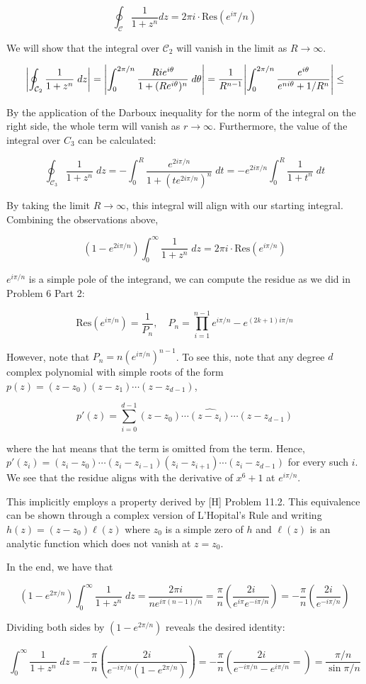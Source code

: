 \documentclass[12pt]{article}%
\newcommand{\C}{\mathcal{C}}
\begin{document}
\begin{enumerate}[i.]
  \[ \oint_{\C} \frac{1}{1 + z^n} dz = 2\pi i \cdot \text{Res}(e^{i \pi}/ n) \]

  We will show that the integral over $\C_2$ will vanish in the limit as $R \rightarrow \infty$.

  \begin{align*}
    \abs{\oint_{\C_2} \frac{1}{1 + z^n} \; dz} = \abs{\int_0^{2\pi/n} \frac{Rie^{i\theta}}{1 + (Re^{i\theta})^n}\; d\theta} = \frac{1}{R^{n-1}} \abs{\int_0^{2\pi/n} \frac{e^{i\theta}}{e^{ni\theta} + 1/R^n}} \leq
  \end{align*}

By the application of the Darboux inequality for the norm of the integral on the right side, the whole term will vanish as $r \rightarrow \infty$. Furthermore, the value of the integral over $C_3$ can be calculated:

\[ \oint_{\C_3} \frac{1}{1 + z^n} \; dz = - \int_{0}^{R} \frac{e^{2i\pi /n}}{1 + (te^{2i\pi/n})^n} \; dt = - e^{2i\pi/n} \int_0^R \frac{1}{1 + t^n} \; dt \]

By taking the limit $R \rightarrow \infty$, this integral will align with our starting integral. Combining the observations above,

\[ (1-e^{2i\pi/n})\int_0^\infty \frac{1}{1 + z^n} \; dz = 2\pi i \cdot \text{Res}(e^{i\pi/n}) \]

$e^{i\pi/n}$ is a simple pole of the integrand, we can compute the residue as we did in Problem 6 Part 2:

$$ \text{Res}(e^{i\pi /n}) = \frac{1}{P_n}, \quad P_n = \prod_{i=1}^{n-1} e^{i\pi/n} - e^{(2k+1)i\pi/n}$$

However, note that $P_n = n(e^{i\pi/n})^{n-1}$. To see this, note that any degree $d$ complex polynomial with simple roots of the form $p(z) = (z-z_0)(z-z_1)\cdots (z - z_{d-1})$,

\[p'(z) = \sum_{i = 0}^{d-1} (z-z_0)\cdots\widehat{(z-z_i)}\cdots (z- z_{d-1}) \]

where the hat means that the term is omitted from the term. Hence, $p'(z_i) = (z_i - z_0)\cdots (z_i - z_{i-1})(z_i - z_{i+
1})\cdots(z_i - z_{d-1})$ for every such $i$. We see that the residue aligns with the derivative of $x^6+1$ at $e^{i\pi/n}$.

This implicitly employs a property derived by [H] Problem 11.2. This equivalence can be shown through a complex version of L'Hopital's Rule and writing $h(z) = (z-z_0)\ell(z)$ where $z_0$ is a simple zero of $h$ and $\ell(z)$ is an analytic function which does not vanish at $z = z_0$.

In the end, we have that

\[(1-e^{2\pi / n})\int_0^\infty \frac{1}{1 + z^n} \; dz = \frac{2\pi i}{ne^{i\pi (n-1)/n}} = \frac{\pi}{n}\left(\frac{2i}{e^{i\pi}e^{-i\pi/n}}\right)= -\frac{\pi}{n}\left(\frac{2i}{e^{-i\pi/n}}\right)\]

Dividing both sides by $(1-e^{2\pi / n})$ reveals the desired identity:

\[\int_0^\infty \frac{1}{1 + z^n} \; dz = -\frac{\pi}{n}\left(\frac{2i}{e^{-i\pi/n}(1-e^{2\pi / n})}\right) = -\frac{\pi}{n}\left(\frac{2i}{e^{-i\pi/n} - e^{i\pi / n}} = \right) = \frac{\pi/n}{\sin{\pi/n}} \]


\end{enumerate}
\end{document}

